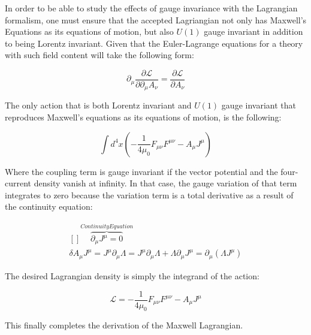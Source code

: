 \documentclass[a4]{article}
\begin{document}
    In order to be able to study the effects of gauge invariance with the Lagrangian formalism, one must ensure that the accepted Lagriangian not only has Maxwell's Equations as its equations of motion, but also $U(1)$ gauge invariant in addition to being Lorentz invariant. Given
    that the Euler-Lagrange equations for a theory with such field content will take the following form:

    \begin{framed}
        \begin{equation}
            \partial_{\mu} \frac{\partial \mathscr{L}}{\partial \partial_{\mu} A_{\nu}} = \frac{\partial \mathscr{L}}{\partial A_{\nu}}
        \end{equation}
    \end{framed}

    The only action that is both Lorentz invariant and $U(1)$ gauge invariant that reproduces Maxwell's equations as its equations of motion, is the following:

    \begin{framed}
        \begin{equation}
            \int d^4 x (- \frac{1}{4 \mu_0} F_{\mu \nu} F^{\mu \nu} - A_{\mu} J^{\mu})
        \end{equation}
    \end{framed}

    Where the coupling term is gauge invariant if the vector potential and the four-current density vanish at infinity. In that case, the gauge variation of that term integrates to zero because the variation term is a total derivative as a result of the continuity equation:

    \begin{framed}
        \begin{equation}
            \begin{aligned}[]
                \overbrace{\partial_{\mu} J^{\mu} = 0}^{Continuity Equation} \\
                \delta A_{\mu} J^{\mu} = J^{\mu} \partial_{\mu} \Lambda = J^{\mu} \partial_{\mu} \Lambda + \Lambda \partial_{\mu} J^{\mu} = \partial_{\mu} (\Lambda J^{\mu})
            \end{aligned}
        \end{equation}
    \end{framed}

    The desired Lagrangian density is simply the integrand of the action:

    \begin{framed}
        \begin{equation}
            \mathscr{L} = - \frac{1}{4 \mu_0} F_{\mu \nu} F^{\mu \nu} - A_{\mu} J^{\mu}
        \end{equation}
    \end{framed}

    This finally completes the derivation of the Maxwell Lagrangian.
\end{document}
